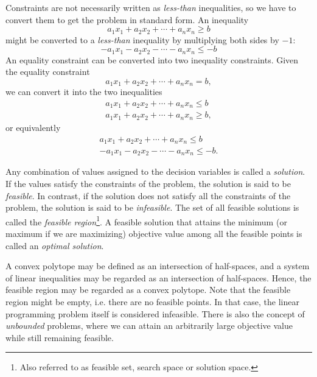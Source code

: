 Constraints are not necessarily written as
\textit{less-than} inequalities, so we have to convert them to get the problem
in standard form. An inequality
\[
a_1 x_1 + a_2 x_2 + \cdots + a_n x_n \geq b
\]
might be converted to a \textit{less-than} inequality by multiplying both
sides by $-1$:
\[
- a_1 x_1 - a_2 x_2 - \cdots - a_n x_n \leq -b
\]
An equality constraint can be converted into two inequality constraints.
Given the equality constraint
\[
a_1 x_1 + a_2 x_2 + \cdots + a_n x_n = b,
\]
we can convert it into the two inequalities
\[
\begin{array}{c}
a_1 x_1 + a_2 x_2 + \cdots + a_n x_n \leq b \\
a_1 x_1 + a_2 x_2 + \cdots + a_n x_n \geq b,
\end{array}
\]
or equivalently
\[
\begin{array}{c}
a_1 x_1 + a_2 x_2 + \cdots + a_n x_n \leq b \\
- a_1 x_1 - a_2 x_2 - \cdots - a_n x_n \leq -b.
\end{array}
\]

Any combination of values assigned to the decision variables is called a
\textit{solution}.
If the values satisfy the constraints of the problem, the solution is
said to be \textit{feasible}. In contrast, if the solution
does not satisfy all the constraints of the problem, the solution is said to
be \textit{infeasible}. The set of all feasible solutions is called the
\textit{feasible region}\footnote{Also referred to as feasible set,
search space or solution space.}\cite{nocedal}. A feasible solution that
attains the minimum (or maximum if we are maximizing) objective value among all
the feasible points is called an \textit{optimal solution}.

A convex polytope may be defined as an intersection of half-spaces, and a
system of linear inequalities may be regarded as an intersection of
half-spaces\cite{branko}.
Hence, the feasible region may be regarded as a convex polytope.
Note that the feasible region might be empty, i.e. there are no feasible
points.
In that case, the linear programming problem itself is considered infeasible.
There is also the concept of \textit{unbounded} problems, where we can attain
an arbitrarily large objective value while still remaining feasible.


